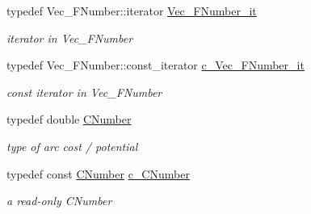 \begin{Indent}
\begin{DoxyCompactItemize}
\mbox{\label{class_s_m_spp__di__unipi__it_1_1_m_c_f_block_af545f74f013406e50f9f3256bc98b216}} 
typedef Vec\+\_\+\+F\+Number\+::iterator \mbox{\hyperlink{class_s_m_spp__di__unipi__it_1_1_m_c_f_block_af545f74f013406e50f9f3256bc98b216}{Vec\+\_\+\+F\+Number\+\_\+it}}
\begin{DoxyCompactList}\small\item\em iterator in Vec\+\_\+\+F\+Number \end{DoxyCompactList}\item 
\mbox{\label{class_s_m_spp__di__unipi__it_1_1_m_c_f_block_a2871db0555b42b11ad5315c7f631473b}} 
typedef Vec\+\_\+\+F\+Number\+::const\+\_\+iterator \mbox{\hyperlink{class_s_m_spp__di__unipi__it_1_1_m_c_f_block_a2871db0555b42b11ad5315c7f631473b}{c\+\_\+\+Vec\+\_\+\+F\+Number\+\_\+it}}
\begin{DoxyCompactList}\small\item\em const iterator in Vec\+\_\+\+F\+Number \end{DoxyCompactList}\item 
\mbox{\label{class_s_m_spp__di__unipi__it_1_1_m_c_f_block_a24d0627ba8213afe1ec4ebeb4508e8f1}} 
typedef double \mbox{\hyperlink{class_s_m_spp__di__unipi__it_1_1_m_c_f_block_a24d0627ba8213afe1ec4ebeb4508e8f1}{C\+Number}}
\begin{DoxyCompactList}\small\item\em type of arc cost / potential \end{DoxyCompactList}\item 
\mbox{\label{class_s_m_spp__di__unipi__it_1_1_m_c_f_block_a8e47cae4e16e180273d262aae769a854}} 
typedef const \mbox{\hyperlink{class_s_m_spp__di__unipi__it_1_1_m_c_f_block_a24d0627ba8213afe1ec4ebeb4508e8f1}{C\+Number}} \mbox{\hyperlink{class_s_m_spp__di__unipi__it_1_1_m_c_f_block_a8e47cae4e16e180273d262aae769a854}{c\+\_\+\+C\+Number}}
\begin{DoxyCompactList}\small\item\em a read-\/only C\+Number \end{DoxyCompactList}\item 
\mbox{\label{class_s_m_spp__di__unipi__it_1_1_m_c_f_block_a9a7c9495f1f1feab22f3c556b70f60f0}} 

\end{DoxyCompactItemize}
\end{Indent}
